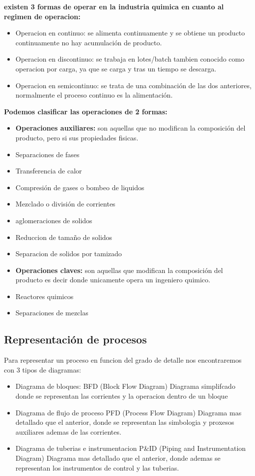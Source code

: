 \documentclass{report}
\begin{document}
\begin{raggedright}
\textbf{existen 3 formas de operar en la industria quimica en cuanto al regimen de operacion:}
\begin{itemize}
	\item Operacion en continuo: se alimenta continuamente y se obtiene un producto continuamente no hay acumulación de producto.
	\item Operacion en discontinuo: se trabaja en lotes/batch tambien conocido como operacion por carga, ya que se carga y tras un tiempo se descarga.
	\item Operacion en semicontinuo: se trata de una combinación de las dos anteriores, normalmente el proceso continuo es la alimentación.
\end{itemize}
\textbf{Podemos clasificar las operaciones de 2 formas:}
\begin{itemize}
	\item  \textbf{\large Operaciones auxiliares:} son aquellas que no modifican la composición del producto, pero si sus propiedades fisicas.
	\item [] Separaciones de fases
	\item [] Transferencia de calor
	\item [] Compresión de gases o bombeo de liquidos
	\item [] Mezclado o división de corrientes
	\item [] aglomeraciones de solidos
	\item [] Reduccion de tamaño de solidos
	\item [] Separacion de solidos por tamizado
	\item  \textbf{\large Operaciones claves:} son aquellas que modifican la composición del producto es decir donde unicamente opera un ingeniero quimico.
	\item [] Reactores quimicos
	\item [] Separaciones de mezclas
\end{itemize}
\end{raggedright}
\subsection{Representación de procesos}
\begin{raggedright}
	Para representar un proceso en funcion del grado de detalle nos encontraremos con 3 tipos de diagramas:
	\begin{itemize}
		\item Diagrama de bloques: BFD (Block Flow Diagram) Diagrama simplifcado donde se representan las corrientes y la operacion dentro de un bloque
		\item Diagrama de flujo de proceso PFD (Process Flow Diagram) Diagrama mas detallado que el anterior, donde se representan las simbologia y proxesos auxiliares ademas de las corrientes.
		\item Diagrama de tuberias e instrumentacion P\&ID (Piping and Instrumentation Diagram) Diagrama mas detallado que el anterior, donde ademas se representan los instrumentos de control y las tuberias.
	\end{itemize}
\end{raggedright}
	
\end{document}
